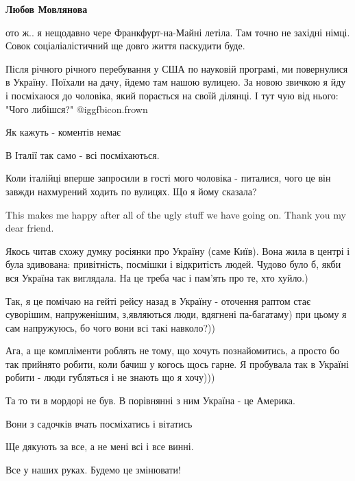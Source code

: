 \begin{itemize}
\begin{itemize}
\textbf{Любов Мовлянова} 

ото ж.. я нещодавно чере Франкфурт-на-Майні летіла. Там точно не західні німці.
Совок соціаліалістичний ще довго життя паскудити буде.

\end{itemize} %


Після річного річного перебування у США по науковій програмі, ми повернулися в
Україну. Поїхали на дачу, йдемо там нашою вулицею. За новою звичкою я йду і
посміхаюся до чоловіка, який порається на своїй ділянці. І тут чую від нього:
"Чого либішся?"  @igg{fbicon.frown} 

Як кажуть - коментів немає


В Італії так само - всі посміхаються.

Коли італійці вперше запросили в гості мого чоловіка - питалися, чого це він
завжди нахмурений ходить по вулицях. Що я йому сказала?


This makes me happy after all of the ugly stuff we have going on. Thank you my dear friend.


Якось читав схожу думку росіянки про Україну (саме Київ). Вона жила в центрі і
була здивована: привітність, посмішки і відкритість людей. Чудово було б, якби
вся Україна так виглядала. На це треба час і пам'ять про те, хто хуйло.)


Так, я це помічаю на гейті рейсу назад в Україну - оточення раптом стає
суворішим, напруженішим, з,являються люди, вдягнені па-багатаму) при цьому я
сам напружуюсь, бо чого вони всі такі навколо?))



Ага, а ще компліменти роблять не тому, що хочуть познайомитись, а просто бо так
прийнято робити, коли бачиш у когось щось гарне. Я пробувала так в Україні
робити - люди губляться і не знають що я хочу)))


Та то ти в мордорі не був. В порівнянні з ним Україна - це Америка.

Вони з садочків вчать посміхатись і вітатись

Ще дякують за все, а не мені всі і все винні.

Все у наших руках. Будемо це змінювати!


\end{itemize}
